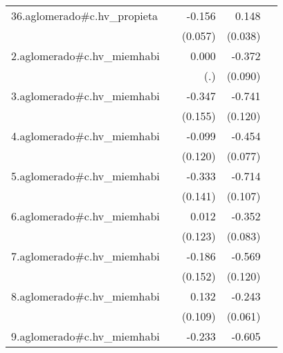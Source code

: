 {\begin{longtable}{l*{4}{D{.}{.}{-1}}}
\addlinespace
36.aglomerado#c.hv\_propieta&                     &      -0.156\sym{**} &       0.148\sym{***}&                     \\
            &                     &     (0.057)         &     (0.038)         &                     \\
\addlinespace
2.aglomerado#c.hv\_miemhabi&                     &       0.000         &      -0.372\sym{***}&                     \\
            &                     &         (.)         &     (0.090)         &                     \\
\addlinespace
3.aglomerado#c.hv\_miemhabi&                     &      -0.347\sym{*}  &      -0.741\sym{***}&                     \\
            &                     &     (0.155)         &     (0.120)         &                     \\
\addlinespace
4.aglomerado#c.hv\_miemhabi&                     &      -0.099         &      -0.454\sym{***}&                     \\
            &                     &     (0.120)         &     (0.077)         &                     \\
\addlinespace
5.aglomerado#c.hv\_miemhabi&                     &      -0.333\sym{*}  &      -0.714\sym{***}&                     \\
            &                     &     (0.141)         &     (0.107)         &                     \\
\addlinespace
6.aglomerado#c.hv\_miemhabi&                     &       0.012         &      -0.352\sym{***}&                     \\
            &                     &     (0.123)         &     (0.083)         &                     \\
\addlinespace
7.aglomerado#c.hv\_miemhabi&                     &      -0.186         &      -0.569\sym{***}&                     \\
            &                     &     (0.152)         &     (0.120)         &                     \\
\addlinespace
8.aglomerado#c.hv\_miemhabi&                     &       0.132         &      -0.243\sym{***}&                     \\
            &                     &     (0.109)         &     (0.061)         &                     \\
\addlinespace
9.aglomerado#c.hv\_miemhabi&                     &      -0.233         &      -0.605\sym{***}&                     \\

\end{longtable}}

